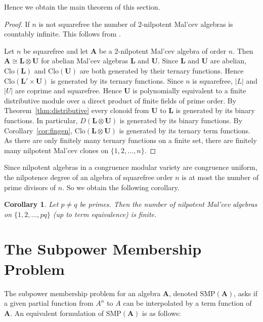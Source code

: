 \documentclass[12pt]{amsart}
\numberwithin{equation}{section}
\theoremstyle{plain}
\newtheorem{cor}[theorem]{Corollary}
\theoremstyle{definition}
\newcommand{\A}{\mathbf{A}}
\renewcommand{\L}{\mathbf{L}}
\newcommand{\U}{\mathbf{U}}
\newcommand{\Clo}{\mathrm{Clo}}
\newcommand{\SMP}{\text{SMP}}
\begin{document}
Hence we obtain the main theorem of this section.

\mainthm*

\begin{proof} 
  If $n$ is not squarefree the number of $2$-nilpotent Mal'cev algebras is countably infinite.
  This follows from \cite{Id:CCMO}.

  Let $n$ be squarefree and let $\A$ be a $2$-nilpotent Mal'cev algebra of order $n$. 
  Then $\A \cong \L \otimes \U$ for abelian Mal'cev algebras $\L$ and $\U$. 
  Since $\L$ and $\U$ are abelian, $\Clo(\L)$ and $\Clo(\U)$ are both generated by their ternary functions. 
  Hence $\Clo(\L' \times \U)$ is generated by its ternary functions.
  Since $n$ is squarefree, $|L|$ and $|U|$ are coprime and squarefree. 
  Hence $\U$ is polynomially equivalent to a finite distributive module over a direct 
    product of finite fields of prime order. 
  By Theorem~\ref{thm:distributive} every clonoid from $\U$ to $\L$ is generated by its binary functions.
  In particular, $D(\L \otimes \U)$ is generated by its binary functions. 
  By Corollary~\ref{cor:fingen}, $\Clo(\L \otimes \U)$ is generated by its ternary term functions.
  As there are only finitely many ternary functions on a finite set, there are finitely 
    many nilpotent Mal'cev clones on $\{1,2,\ldots,n\}$. 
\end{proof}

Since nilpotent algebras in a congruence modular variety are congruence uniform, 
  the nilpotence degree of an algebra of squarefree order $n$ is at most the number of 
  prime divisors of $n$. 
So we obtain the following corollary.

\begin{cor} 
  Let $p \neq q$ be primes. 
  Then the number of nilpotent Mal'cev algebras on $\{1,2,\ldots,pq\}$ (up to term equivalence) is finite.
\end{cor}


\section{The Subpower Membership Problem}\label{section:SMP}

The subpower membership problem for an algebra $\A$, denoted $\SMP(\A)$, 
  asks if a given partial function from $A^n$ to $A$ can be interpolated by a term function of $\A$. 
An equivalent formulation of $\SMP(\A)$ is as follows:
\end{document}
